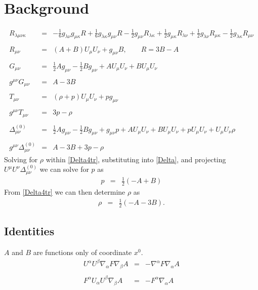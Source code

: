 \documentclass[10pt,letterpaper]{article}
\numberwithin{equation}{section}
\begin{document}
\section{Background}
\begin{eqnarray}
R_{\lambda\mu\nu\kappa} &=&- \tfrac{1}{6} g_{\lambda \nu } g_{\mu \kappa } R + \tfrac{1}{6} g_{\lambda \kappa } g_{\mu \nu } R -  \tfrac{1}{2} g_{\mu \nu } R_{\lambda \kappa } + \tfrac{1}{2} g_{\mu \kappa } R_{\lambda \nu } + \tfrac{1}{2} g_{\lambda \nu } R_{\mu \kappa } -  \tfrac{1}{2} g_{\lambda \kappa } R_{\mu \nu }
\\ \nonumber\\
R_{\mu\nu} &=& (A+B)U_\mu U_\nu + g_{\mu\nu}B,\qquad R=3B-A
\label{Ricci}
\\ \nonumber\\
G_{\mu\nu}&=& \tfrac{1}{2} A g_{\mu \nu } -  \tfrac{1}{2} B g_{\mu \nu } + A U_{\mu } U_{\nu } + B U_{\mu } U_{\nu }
\\  \nonumber\\ 
g^{\mu\nu}G_{\mu\nu}&=& A - 3 B
\\ \nonumber\\
T_{\mu\nu} &=& (\rho+p)U_\mu U_\nu +  p g_{\mu\nu}
\\ \nonumber\\
g^{\mu\nu}T_{\mu\nu} &=& 3p-\rho
\\ \nonumber\\
\Delta_{\mu\nu}^{(0)}&=&\tfrac{1}{2} A g_{\mu \nu } -  \tfrac{1}{2} B g_{\mu \nu } + g_{\mu \nu } p + A U_{\mu } U_{\nu } + B U_{\mu } U_{\nu } + p U_{\mu } U_{\nu } + U_{\mu } U_{\nu } \rho 
\label{Delta}
\\ \nonumber\\
g^{\mu\nu}\Delta_{\mu\nu}^{(0)}&=& A - 3 B + 3 p -  \rho 
\label{Delta4tr}
\end{eqnarray}
Solving for $\rho$ within \eqref{Delta4tr}, substituting into \eqref{Delta}, and projecting $U^\mu U^\nu \Delta_{\mu\nu}^{(0)}$ we can solve for $p$ as
\begin{eqnarray}
p &=& \tfrac{1}{2} (- A + B)
\end{eqnarray}
From \eqref{Delta4tr} we can then determine $\rho$ as
\begin{eqnarray}
\rho &=& \tfrac{1}{2} (- A - 3 B).
\end{eqnarray}
%
%
%
\subsection{Identities}
$A$ and $B$ are functions only of coordinate $x^0$. 
\begin{eqnarray}
U^\alpha U^\beta \nabla_\alpha F\nabla_\beta A &=& -\nabla^\alpha F \nabla_\alpha A
\\ \nonumber\\
F^\alpha U_\alpha U^\beta \nabla_\beta A &=& -F^\alpha \nabla_\alpha A
\end{eqnarray}
%
%
\end{document}
